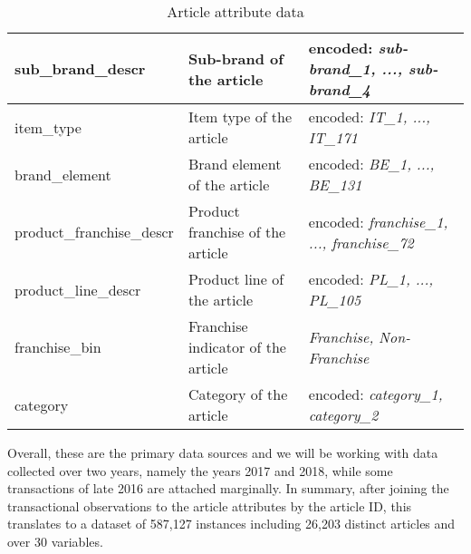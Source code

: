 \begin{table}[H]
\begin{adjustbox}{max width=\textwidth}
\begin{tabular}{|l|l|l|}
sub\_brand\_descr         & Sub-brand of the article                               & encoded: \textit{sub-brand\_1, ..., sub-brand\_4 }     \\ \hline
item\_type                & Item type of the article                               & encoded: \textit{IT\_1, ..., IT\_171 }                 \\ \hline
brand\_element            & Brand element of the article                           & encoded: \textit{BE\_1, ..., BE\_131 }                   \\ \hline
product\_franchise\_descr & Product franchise of the article                       & encoded: \textit{franchise\_1, ..., franchise\_72}     \\ \hline
product\_line\_descr      & Product line of the article                            & encoded: \textit{PL\_1, ..., PL\_105 }                 \\ \hline
franchise\_bin            & Franchise indicator of the article                     &\textit{Franchise, Non-Franchise }                     \\ \hline
category                  & Category of the article                                & encoded: \textit{category\_1, category\_2}             \\ \hline
\end{tabular}
\end{adjustbox}
\caption{Article attribute data}
\label{tab:article_master_data}
\end{table}

Overall, these are the primary data sources and we will be working with data collected over two years, namely the years 2017 and 2018, while some transactions of late 2016 are attached marginally. In summary, after joining the transactional observations to the article attributes by the article ID, this translates to a dataset of 587,127 instances including 26,203 distinct articles and over 30 variables. 


